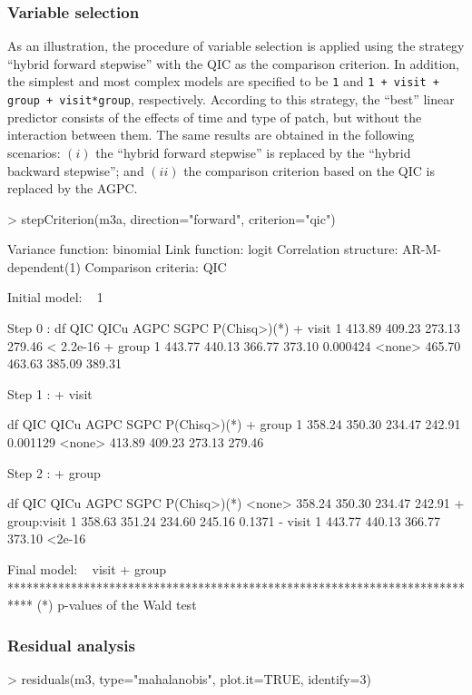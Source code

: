 \subsubsection{Variable selection}
As an illustration, the procedure of variable selection is applied using the strategy ``hybrid forward stepwise'' with the QIC as the comparison criterion. In addition, the simplest and most complex models are specified to be {\tt 1} and {\tt 1 + visit + group + visit*group}, respectively. According to this strategy, the ``best'' linear predictor consists of the effects of time and type of patch, but without the interaction between them. The same results are obtained in the following scenarios: $(i)$ the ``hybrid forward stepwise'' is replaced by the ``hybrid backward stepwise''; and $(ii)$ the comparison criterion based on the QIC is replaced by the AGPC.
\begin{example}
> stepCriterion(m3a, direction="forward", criterion="qic")

    Variance function:  binomial
        Link function:  logit 
Correlation structure:  AR-M-dependent(1) 
  Comparison criteria:  QIC

Initial model:
~ 1 

Step 0 :
               df    QIC   QICu   AGPC   SGPC P(Chisq>)(*)
+ visit         1 413.89 409.23 273.13 279.46    < 2.2e-16
+ group         1 443.77 440.13 366.77 373.10     0.000424
<none>            465.70 463.63 385.09 389.31             

Step 1 : + visit 

               df    QIC   QICu   AGPC   SGPC P(Chisq>)(*)
+ group         1 358.24 350.30 234.47 242.91     0.001129
<none>            413.89 409.23 273.13 279.46             

Step 2 : + group 

               df    QIC   QICu   AGPC   SGPC P(Chisq>)(*)
<none>            358.24 350.30 234.47 242.91             
+ group:visit   1 358.63 351.24 234.60 245.16       0.1371
- visit         1 443.77 440.13 366.77 373.10       <2e-16

Final model:
~ visit + group 
****************************************************************************
(*) p-values of the Wald test
\end{example}

\subsubsection{Residual analysis}
\begin{example}
> residuals(m3, type="mahalanobis", plot.it=TRUE, identify=3)
\end{example}

